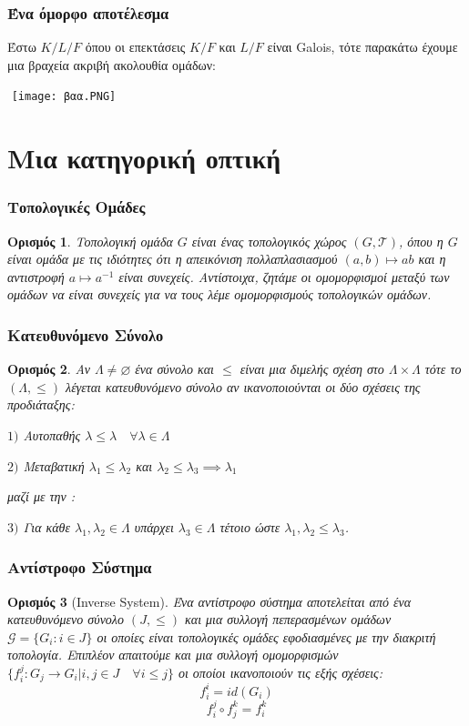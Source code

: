 \documentclass{beamer}
\newcommand {\tl}{\textlatin}
\newtheorem*{defn}{Ορισμός}
\begin{document}
\begin{frame}
\frametitle{Ένα όμορφο αποτέλεσμα}
    Έστω $K/L/F$ όπου οι επεκτάσεις $K/F$ και $L/F$ είναι \tl{Galois}, τότε παρακάτω έχουμε μια βραχεία ακριβή ακολουθία ομάδων:
    
    $ $\newline
    \texttt{[image: βαα.PNG]}
\end{frame}



\section{Μια κατηγορική οπτική}


\begin{frame}
    \frametitle{Τοπολογικές Ομάδες}
    
    \begin{defn}Τοπολογική ομάδα $G$ είναι ένας τοπολογικός χώρος $(G,\mathcal T )$, όπου η $G$ είναι ομάδα με τις ιδιότητες ότι η απεικόνιση πολλαπλασιασμού $(a,b) \mapsto ab$ και η αντιστροφή $a \mapsto a^{-1}$ είναι συνεχείς. Αντίστοιχα, ζητάμε οι ομομορφισμοί μεταξύ των ομάδων να είναι συνεχείς για να τους λέμε ομομορφισμούς τοπολογικών ομάδων.
\end{defn}
\end{frame}

\begin{frame}
\frametitle{Κατευθυνόμενο Σύνολο}
\begin{defn} Αν $\Lambda\neq \varnothing$ ένα σύνολο και $\leq$ είναι μια διμελής σχέση στο $\Lambda \times \Lambda$ τότε το $(\Lambda , \leq )$ λέγεται κατευθυνόμενο σύνολο αν ικανοποιούνται οι δύο σχέσεις της προδιάταξης:

$1)$ Αυτοπαθής $\lambda \leq \lambda \quad\forall \lambda \in \Lambda$

$2)$ Μεταβατική $\lambda_1 \leq \lambda_2$ και  $\lambda_2 \leq \lambda_3 \implies \lambda_1$ 

μαζί με την :

$3)$ Για κάθε $\lambda_1 , \lambda_2 \in \Lambda$ υπάρχει $\lambda_3 \in \Lambda$ τέτοιο ώστε $\lambda_1, \lambda_2 \leq \lambda_3$.
\end{defn}
\end{frame}



\begin{frame}
\frametitle{Αντίστροφο Σύστημα}
\begin{defn}[\tl{Inverse System}] Ένα αντίστροφο σύστημα αποτελείται από ένα κατευθυνόμενο σύνολο $(J,\leq )$ και μια συλλογή πεπερασμένων ομάδων $\mathcal{G} = \{G_i : i \in J\}$ οι οποίες είναι τοπολογικές ομάδες εφοδιασμένες με την διακριτή τοπολογία. Επιπλέον απαιτούμε και μια συλλογή ομομορφισμών $\{f^j_i : G_j \rightarrow G_i | i,j \in J \quad\forall i\leq j\}$ οι οποίοι ικανοποιούν τις εξής σχέσεις:
$$f^i_i = id(G_i)$$
$$f^j_i \circ f^k_j = f^k_i$$
\end{defn}
\end{frame}
\end{document}
